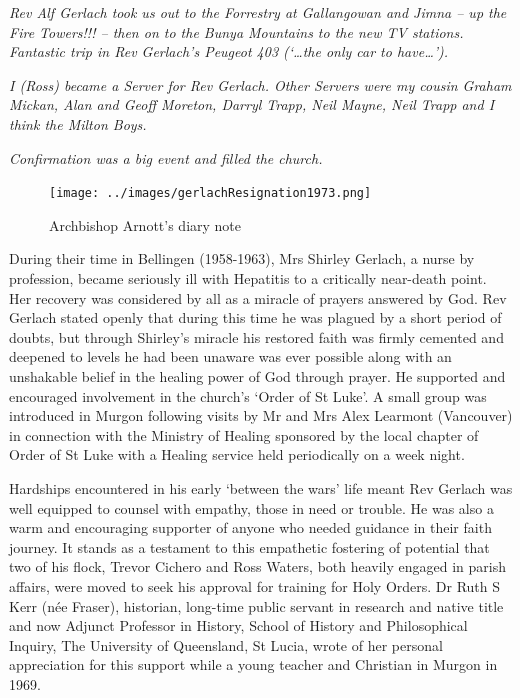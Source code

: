 \smallskip


\emph{Rev Alf Gerlach took us out to the Forrestry at Gallangowan and Jimna -- up the Fire Towers!!! -- then on to the Bunya Mountains to the new TV stations. Fantastic trip in Rev Gerlach's Peugeot 403 (`\ldots the only car to have\ldots').}



\smallskip


\emph{I (Ross) became a Server for Rev Gerlach. Other Servers were my cousin Graham Mickan, Alan and Geoff Moreton, Darryl Trapp, Neil Mayne, Neil Trapp and I think the Milton Boys.}



\smallskip


\emph{Confirmation was a big event and filled the church.}



\medskip








\begin{figure}[!htb]
\begin{center}
\texttt{[image: ../images/gerlachResignation1973.png]}
\caption{Archbishop Arnott's diary note}
\end{center}
\end{figure}




During their time in Bellingen (1958-1963), Mrs Shirley Gerlach, a nurse by profession, became seriously ill with Hepatitis to a critically near-death point. Her recovery was considered by all as a miracle of prayers answered by God. Rev Gerlach stated openly that during this time he was plagued by a short period of doubts, but through Shirley's miracle his restored faith was firmly cemented and deepened to levels he had been unaware was ever possible along with an unshakable belief in the healing power of God through prayer. He supported and encouraged involvement in the church's `Order of St Luke'. A small group was introduced in Murgon following visits by Mr and Mrs Alex Learmont (Vancouver) in connection with the Ministry of Healing sponsored by the local chapter of Order of St Luke with a Healing service held periodically on a week night.



Hardships encountered in his early `between the wars' life meant Rev Gerlach was well equipped to counsel with empathy, those in need or trouble. He was also a warm and encouraging supporter of anyone who needed guidance in their faith journey. It stands as a testament to this empathetic fostering of potential that two of his flock, Trevor Cichero and Ross Waters, both heavily engaged in parish affairs, were moved to seek his approval for training for Holy Orders. Dr Ruth S Kerr (née Fraser), historian, long-time public servant in research and native title and now Adjunct Professor in History, School of History and Philosophical Inquiry, The University of Queensland, St Lucia, wrote of her personal appreciation for this support while a young teacher and Christian in Murgon in 1969.



